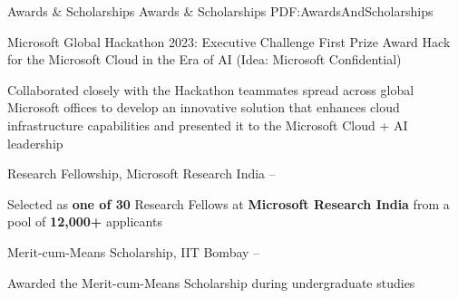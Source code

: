 \Section
{Awards \&\newline
Scholarships}
{Awards \& Scholarships}
{PDF:AwardsAndScholarships}


\BulletItem
Microsoft Global Hackathon 2023: Executive Challenge First Prize Award
\hfill
{\footnotesize
{}
}
\newline
{\small Hack for the Microsoft Cloud in the Era of AI (Idea: Microsoft Confidential)}
\begin{Detail}
\Item
Collaborated closely with the Hackathon teammates spread across global Microsoft offices to develop an innovative
solution that enhances cloud infrastructure capabilities and presented it to the Microsoft Cloud + AI leadership
\end{Detail}

\Gap
\BulletItem
Research Fellowship,
Microsoft Research India
\hfill
{\footnotesize
{} --
}
\begin{Detail}
\Item
Selected as {\bf one of 30} Research Fellows at {\bf Microsoft Research India} from a pool of {\bf 12,000+} applicants
\end{Detail}

\Gap
\BulletItem
Merit-cum-Means Scholarship, IIT Bombay
\hfill
{\footnotesize
{} --
}
\begin{Detail}
\Item
Awarded the Merit-cum-Means Scholarship during undergraduate studies
\end{Detail}